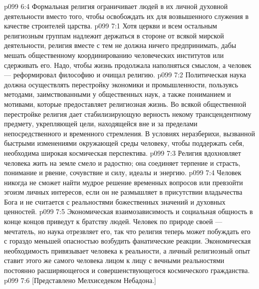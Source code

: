 \vs p099 6:4 Формальная религия ограничивает людей в их личной духовной деятельности вместо того, чтобы освобождать их для возвышенного служения в качестве строителей царства.
\vs p099 7:1 Хотя церкви и всем остальным религиозным группам надлежит держаться в стороне от всякой мирской деятельности, религия вместе с тем не должна ничего предпринимать, дабы мешать общественному координированию человеческих институтов или сдерживать его. Надо, чтобы жизнь продолжала наполняться смыслом, а человек --- реформировал философию и очищал религию.
\vs p099 7:2 Политическая наука должна осуществлять перестройку экономики и промышленности, пользуясь методами, заимствованными у общественных наук, а также пониманием и мотивами, которые предоставляет религиозная жизнь. Во всякой общественной перестройке религия дает стабилизирующую верность некому трансцендентному предмету, укрепляющей цели, находящейся вне и за пределами непосредственного и временного стремления. В условиях неразберихи, вызванной быстрыми изменениями окружающей среды человеку, чтобы поддержать себя, необходима широкая космическая перспектива.
\vs p099 7:3 Религия вдохновляет человека жить на земле смело и радостно; она соединяет терпение и страсть, понимание и рвение, сочувствие и силу, идеалы и энергию.
\vs p099 7:4 Человек никогда не сможет найти мудрое решение временных вопросов или превзойти эгоизм личных интересов, если он не размышляет в присутствии владычества Бога и не считается с реальностями божественных значений и духовных ценностей.
\vs p099 7:5 Экономическая взаимозависимость и социальная общность в конце концов приведут к братству людей. Человек по природе своей --- мечтатель, но наука отрезвляет его, так что религия теперь может побуждать его с гораздо меньшей опасностью возбудить фанатические реакции. Экономическая необходимость привязывает человека к реальности, а личный религиозный опыт ставит этого же самого человека лицом к лицу с вечными реальностями постоянно расширяющегося и совершенствующегося космического гражданства.
\vs p099 7:6 [Представлено Мелхиседеком Небадона.]
